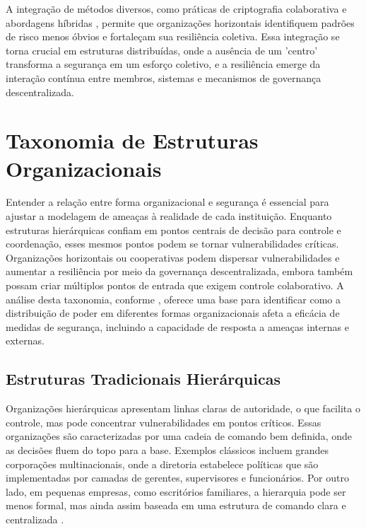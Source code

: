A integração de métodos diversos, como práticas de criptografia
colaborativa \cite{AbcCrypto} e abordagens híbridas \cite{CoReTM}, permite
que organizações horizontais identifiquem padrões de risco menos óbvios e
fortaleçam sua resiliência coletiva. Essa integração se torna crucial em
estruturas distribuídas, onde a ausência de um 'centro' transforma a
segurança em um esforço coletivo, e a resiliência emerge da interação
contínua entre membros, sistemas e mecanismos de governança
descentralizada.

\section{Taxonomia de Estruturas Organizacionais}
\label{sec:taxonomia_de_estruturas_organizacionais}

Entender a relação entre forma organizacional e segurança é essencial para
ajustar a modelagem de ameaças à realidade de cada instituição. Enquanto
estruturas hierárquicas confiam em pontos centrais de decisão para controle
e coordenação, esses mesmos pontos podem se tornar vulnerabilidades
críticas. Organizações horizontais ou cooperativas podem
dispersar vulnerabilidades e aumentar a resiliência por meio da governança
descentralizada, embora também possam criar múltiplos pontos de entrada que
exigem controle colaborativo. A análise desta taxonomia, conforme
\cite{WorkerCooperativesinAmerica, RealNotNominalGlobalDemocracy}, oferece
uma base para identificar como a distribuição de poder em diferentes formas
organizacionais afeta a eficácia de medidas de segurança, incluindo a
capacidade de resposta a ameaças internas e externas.

\subsection{Estruturas Tradicionais Hierárquicas}
\label{sec:estruturas_tradicionais_hierarquicas}

Organizações hierárquicas apresentam linhas claras de autoridade, o que
facilita o controle, mas pode concentrar vulnerabilidades em pontos
críticos. Essas organizações são caracterizadas por uma cadeia de comando
bem definida, onde as decisões fluem do topo para a base. Exemplos
clássicos incluem grandes corporações multinacionais, onde a diretoria
estabelece políticas que são implementadas por camadas de gerentes,
supervisores e funcionários. Por outro lado, em pequenas empresas, como
escritórios familiares, a hierarquia pode ser menos formal, mas ainda assim
baseada em uma estrutura de comando clara e centralizada \cite{WorkerCooperativesinAmerica}.

